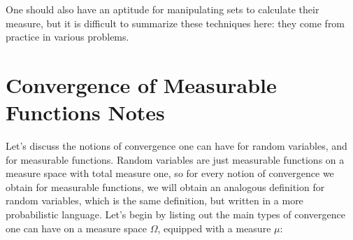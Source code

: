 \documentclass[answers]{exam}
\theoremstyle{problemstyle}
\newcommand{\1}[1]{\textbf{1}_{\left[#1\right]}} %
\begin{document}
%
One should also have an aptitude for manipulating sets to calculate their measure, but it is difficult to summarize these techniques here: they come from practice in various problems.



\newpage
\section{Convergence of Measurable Functions Notes}

Let's discuss the notions of convergence one can have for random variables, and for measurable functions. Random variables are just measurable functions on a measure space with total measure one, so for every notion of convergence we obtain for measurable functions, we will obtain an analogous definition for random variables, which is the same definition, but written in a more probabilistic language. Let's begin by listing out the main types of convergence one can have on a measure space $\Omega$, equipped with a measure $\mu$:
%
\end{document}
